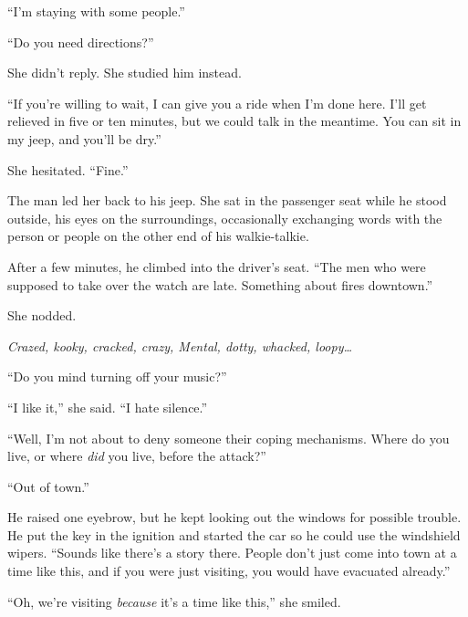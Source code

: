 ``I'm staying with some people.''



``Do you need directions?''



She didn't reply.  She studied him instead.



``If you're willing to wait, I can give you a ride when I'm done here.  I'll get relieved in five or ten minutes, but we could talk in the meantime.  You can sit in my jeep, and you'll be dry.''



She hesitated.  ``Fine.''



The man led her back to his jeep.  She sat in the passenger seat while he stood outside, his eyes on the surroundings, occasionally exchanging words with the person or people on the other end of his walkie-talkie.



After a few minutes, he climbed into the driver's seat.  ``The men who were supposed to take over the watch are late.  Something about fires downtown.''



She nodded.



\emph{Crazed, kooky, cracked, crazy, Mental, dotty, whacked, loopy\ldots}



``Do you mind turning off your music?''



``I like it,'' she said.  ``I hate silence.''



``Well, I'm not about to deny someone their coping mechanisms.  Where do you live, or where \emph{did} you live, before the attack?''



``Out of town.''



He raised one eyebrow, but he kept looking out the windows for possible trouble.  He put the key in the ignition and started the car so he could use the windshield wipers.  ``Sounds like there's a story there.  People don't just come into town at a time like this, and if you were just visiting, you would have evacuated already.''



``Oh, we're visiting \emph{because} it's a time like this,'' she smiled.



